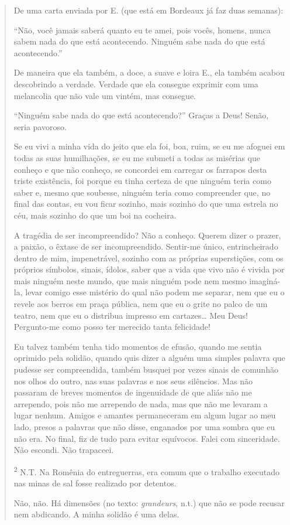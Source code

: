 \begin{quote}
De uma carta enviada por E. (que está em Bordeaux já faz duas semanas):

``Não, você jamais saberá quanto eu te amei, pois vocês, homens, nunca
sabem nada do que está acontecendo. Ninguém sabe nada do que está
acontecendo.''

De maneira que ela também, a doce, a suave e loira E., ela também acabou
descobrindo a verdade. Verdade que ela consegue exprimir com uma
melancolia que não vale um vintém, mas consegue.

``Ninguém sabe nada do que está acontecendo?'' Graças a Deus! Senão,
seria pavoroso.

Se eu vivi a minha vida do jeito que ela foi, boa, ruim, se eu me
afoguei em todas as suas humilhações, se eu me submeti a todas as
misérias que conheço e que não conheço, se concordei em carregar os
farrapos desta triste existência, foi porque eu tinha certeza de que
ninguém teria como saber e, mesmo que soubesse, ninguém teria como
compreender que, no final das contas, eu vou ficar sozinho, mais sozinho
do que uma estrela no céu, mais sozinho do que um boi na cocheira.

A tragédia de ser incompreendido? Não a conheço. Querem dizer o prazer,
a paixão, o êxtase de ser incompreendido. Sentir-me único,
entrincheirado dentro de mim, impenetrável, sozinho com as próprias
superstições, com os próprios símbolos, sinais, ídolos, saber que a vida
que vivo não é vivida por mais ninguém neste mundo, que mais ninguém
pode nem mesmo imaginá-la, levar comigo esse mistério do qual não podem
me separar, nem que eu o revele aos berros em praça pública, nem que eu
o grite no palco de um teatro, nem que eu o distribua impresso em
cartazes\ldots{} Meu Deus! Pergunto-me como posso ter merecido tanta
felicidade!

Eu talvez também tenha tido momentos de efusão, quando me sentia
oprimido pela solidão, quando quis dizer a alguém uma simples palavra
que pudesse ser compreendida, também busquei por vezes sinais de
comunhão nos olhos do outro, nas suas palavras e nos seus silêncios. Mas
não passaram de breves momentos de ingenuidade de que aliás não me
arrependo, pois não me arrependo de nada, mas que não me levaram a lugar
nenhum. Amigos e amantes permaneceram em algum lugar ao meu lado, presos
a palavras que não disse, enganados por uma sombra que eu não era. No
final, fiz de tudo para evitar equívocos. Falei com sinceridade. Não
escondi. Não trapaceei.

\textsuperscript{2} \protect\hypertarget{_bookmark1}{}{}N.T. Na Romênia
do entreguerras, era comum que o trabalho executado nas minas de sal
fosse realizado por detentos.

Não, não. Há dimensões (no texto: \emph{grandeurs}, n.t.) que não se
pode recusar nem abdicando. A minha solidão é uma delas.
\end{quote}

